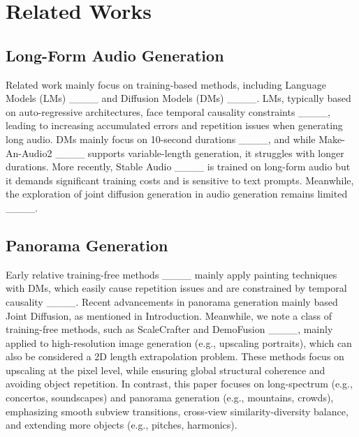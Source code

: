 \section{Related Works}
\subsection{Long-Form Audio Generation}
Related work mainly focus on training-based methods, including Language Models (LMs) ____ and Diffusion Models (DMs) ____. LMs, typically based on auto-regressive architectures, face temporal causality constraints ____, leading to increasing accumulated errors and repetition issues when generating long audio. DMs mainly focus on 10-second durations ____, and while Make-An-Audio2 ____ supports variable-length generation, it struggles with longer durations. More recently, Stable Audio ____ is trained on long-form audio but it demands significant training costs and is sensitive to text prompts. Meanwhile, the exploration of joint diffusion generation in audio generation remains limited ____.



\subsection{Panorama Generation}
Early relative training-free methods ____ mainly apply painting techniques with DMs, which easily cause repetition issues and are constrained by temporal causality ____. Recent advancements in panorama generation mainly based Joint Diffusion, as mentioned in Introduction. Meanwhile, we note a class of training-free methods, such as ScaleCrafter and DemoFusion ____, mainly applied to high-resolution image generation (e.g., upscaling portraits), which can also be considered a 2D length extrapolation problem. These methods focus on upscaling at the pixel level, while ensuring global structural coherence and avoiding object repetition. In contrast, this paper focuses on long-spectrum (e.g., concertos, soundscapes) and panorama generation (e.g., mountains, crowds), emphasizing smooth subview transitions, cross-view similarity-diversity balance, and extending more objects (e.g., pitches, harmonics).
